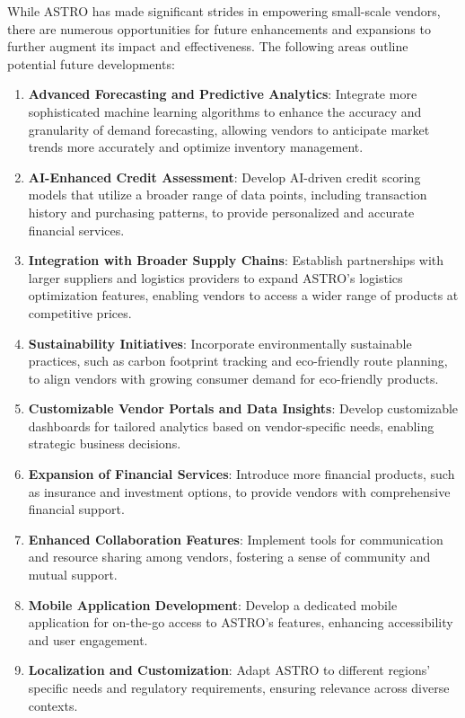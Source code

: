 While ASTRO has made significant strides in empowering small-scale vendors, there are numerous opportunities for future enhancements and expansions to further augment its impact and effectiveness. The following areas outline potential future developments:

\begin{enumerate}
    \item \textbf{Advanced Forecasting and Predictive Analytics}: Integrate more sophisticated machine learning algorithms to enhance the accuracy and granularity of demand forecasting, allowing vendors to anticipate market trends more accurately and optimize inventory management.
    \item \textbf{AI-Enhanced Credit Assessment}: Develop AI-driven credit scoring models that utilize a broader range of data points, including transaction history and purchasing patterns, to provide personalized and accurate financial services.
    \item \textbf{Integration with Broader Supply Chains}: Establish partnerships with larger suppliers and logistics providers to expand ASTRO’s logistics optimization features, enabling vendors to access a wider range of products at competitive prices.
    \item \textbf{Sustainability Initiatives}: Incorporate environmentally sustainable practices, such as carbon footprint tracking and eco-friendly route planning, to align vendors with growing consumer demand for eco-friendly products.
    \item \textbf{Customizable Vendor Portals and Data Insights}: Develop customizable dashboards for tailored analytics based on vendor-specific needs, enabling strategic business decisions.
    \item \textbf{Expansion of Financial Services}: Introduce more financial products, such as insurance and investment options, to provide vendors with comprehensive financial support.
    \item \textbf{Enhanced Collaboration Features}: Implement tools for communication and resource sharing among vendors, fostering a sense of community and mutual support.
    \item \textbf{Mobile Application Development}: Develop a dedicated mobile application for on-the-go access to ASTRO’s features, enhancing accessibility and user engagement.
    \item \textbf{Localization and Customization}: Adapt ASTRO to different regions’ specific needs and regulatory requirements, ensuring relevance across diverse contexts.

\end{enumerate}
